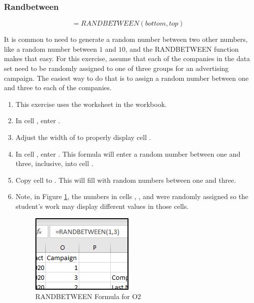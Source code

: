 \subsubsection{Randbetween}

\[ =RANDBETWEEN(bottom, top) \]

It is common to need to generate a random number between two other numbers, like a random number between $ 1 $ and $ 10 $, and the RANDBETWEEN function makes that easy. For this exercise, assume that each of the companies in the data set need to be randomly assigned to one of  three groups for an advertising campaign. The easiest way to do that is to assign a random number between one and three to each of the companies.

\begin{enumerate}
	\item This exercise uses the  worksheet in the  workbook.
	\item In cell , enter .
	\item Adjust the width of  to properly display cell .
	\item In cell , enter . This formula will enter a random number between one and three, inclusive, into cell .
	\item Copy cell  to . This will fill  with random numbers between one and three.
	\item Note, in Figure \ref{09:fig44}, the numbers in cells , , and  were randomly assigned so the student's work may display different values in those cells.
	
	\begin{figure}[H]
		\centering
		\includegraphics[width=\maxwidth{.50\linewidth}]{gfx/ch09_fig44}
		\caption{RANDBETWEEN Formula for O2}
		\label{09:fig44}
	\end{figure}
	
\end{enumerate}
	
